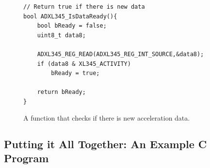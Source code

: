\documentclass[11pt, twoside, pdftex]{article}
\begin{document}

\begin{figure}[H]
\begin{center}
\begin{minipage}[t]{16 cm}
\begin{lstlisting}
// Return true if there is new data
bool ADXL345_IsDataReady(){
    bool bReady = false;
    uint8_t data8;
    
    ADXL345_REG_READ(ADXL345_REG_INT_SOURCE,&data8);
    if (data8 & XL345_ACTIVITY)
        bReady = true;
    
    return bReady;
}
\end{lstlisting}
\end{minipage}
\end{center}
\vspace{-0.33in}\caption{A function that checks if there is new acceleration data.}
\label{fig:check_data_ready}
\end{figure}

\subsection{Putting it All Together: An Example C Program}
\end{document}
